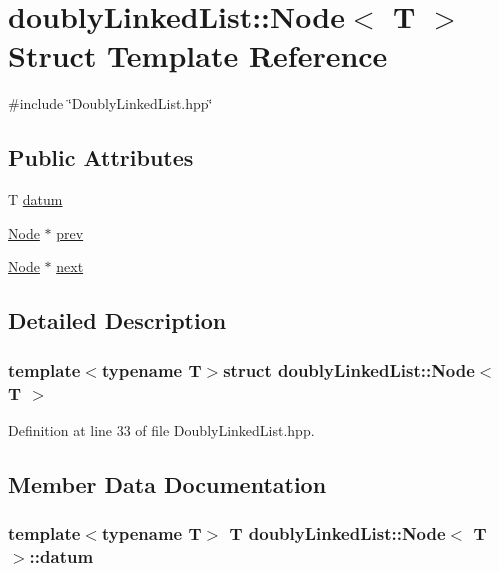 \hypertarget{structdoublyLinkedList_1_1Node}{\section{doubly\-Linked\-List\-:\-:Node$<$ T $>$ Struct Template Reference}
\label{structdoublyLinkedList_1_1Node}
}


{\ttfamily \#include \char`\"{}Doubly\-Linked\-List.\-hpp\char`\"{}}

\subsection*{Public Attributes}
\begin{DoxyCompactItemize}
\item 
T \hyperlink{structdoublyLinkedList_1_1Node_aa50be993ba9f34fe04dc7920d4dde8cf}{datum}
\item 
\hyperlink{structdoublyLinkedList_1_1Node}{Node} $\ast$ \hyperlink{structdoublyLinkedList_1_1Node_ac5e129edb8062b6dde2866cd930e960d}{prev}
\item 
\hyperlink{structdoublyLinkedList_1_1Node}{Node} $\ast$ \hyperlink{structdoublyLinkedList_1_1Node_a1513e3f4f530d95c634deeb9ed9cfdbe}{next}
\end{DoxyCompactItemize}


\subsection{Detailed Description}
\subsubsection*{template$<$typename T$>$struct doubly\-Linked\-List\-::\-Node$<$ T $>$}



Definition at line 33 of file Doubly\-Linked\-List.\-hpp.



\subsection{Member Data Documentation}
\hypertarget{structdoublyLinkedList_1_1Node_aa50be993ba9f34fe04dc7920d4dde8cf}{
\subsubsection[{datum}]{\setlength{\rightskip}{0pt plus 5cm}template$<$typename T$>$ T {\bf doubly\-Linked\-List\-::\-Node}$<$ T $>$\-::datum}}\label{structdoublyLinkedList_1_1Node_aa50be993ba9f34fe04dc7920d4dde8cf}


